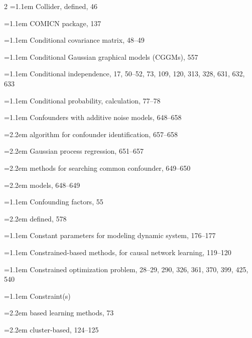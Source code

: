 \begin{multicols}{2}
\noindent\hangindent=1.1em Collider, defined, 46\par
\noindent\hangindent=1.1em COMICN package, 137\par
\noindent\hangindent=1.1em Conditional covariance matrix, 48--49\par
\noindent\hangindent=1.1em Conditional Gaussian graphical models (CGGMs), 557\par
\noindent\hangindent=1.1em Conditional independence, 17, 50--52, 73, 109, 120, 313, 328, 631, 632, 633\par
\noindent\hangindent=1.1em Conditional probability, calculation, 77--78\par
\noindent\hangindent=1.1em Confounders with additive noise models, 648--658\par
\noindent\hangindent=2.2em \hspace*{1.1em}algorithm for confounder identification, 657--658\par
\noindent\hangindent=2.2em \hspace*{1.1em}Gaussian process regression, 651--657\par
\noindent\hangindent=2.2em \hspace*{1.1em}methods for searching common confounder, 649--650\par
\noindent\hangindent=2.2em \hspace*{1.1em}models, 648--649\par
\noindent\hangindent=1.1em Confounding factors, 55\par
\noindent\hangindent=2.2em \hspace*{1.1em}defined, 578\par
\noindent\hangindent=1.1em Constant parameters for modeling dynamic system, 176--177\par
\noindent\hangindent=1.1em Constrained-based methods, for causal network learning, 119--120\par
\noindent\hangindent=1.1em Constrained optimization problem, 28--29, 290, 326, 361, 370, 399, 425, 540\par
\noindent\hangindent=1.1em Constraint(s)\par
\noindent\hangindent=2.2em \hspace*{1.1em}based learning methods, 73\par
\noindent\hangindent=2.2em \hspace*{1.1em}cluster-based, 124--125\par

\end{multicols}
